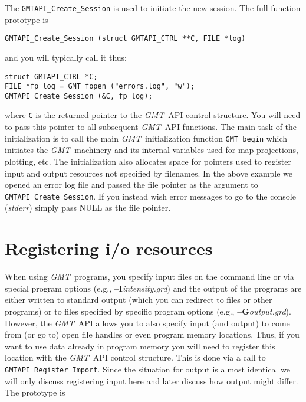 \documentclass{report}
\newcommand{\GMT}{\textit{GMT}}%
\newcommand{\GMT}{\htmladdnormallink{\texttt{[image: eps/GMT\_glyph10.eps]}}{http://gmt.soest.hawaii.edu}}%
\newcommand{\Opt}[1]{{\bf --#1}}%
\newcommand{\GMT}{\htmladdnormallink{\textbf{GMT}}{http://gmt.soest.hawaii.edu}}%
\newcommand{\Opt}[1]{{\bf -#1}}%
\begin{document}
The \texttt{GMTAPI\_Create\_Session} is used to initiate the new session.  The full
function prototype is

\begin{verbatim}
GMTAPI_Create_Session (struct GMTAPI_CTRL **C, FILE *log)
\end{verbatim}
and you will typically call it thus:
\begin{verbatim}
struct GMTAPI_CTRL *C;
FILE *fp_log = GMT_fopen ("errors.log", "w");
GMTAPI_Create_Session (&C, fp_log);
\end{verbatim}
where \texttt{C} is the returned pointer to the \GMT\ API control structure.  You will need to
pass this pointer to all subsequent \GMT\ API functions.  The main task of the initialization
is to call the main \GMT\ initialization function \texttt{GMT\_begin} which initiates the \GMT\
machinery and its internal variables used for map projections, plotting, etc.  The initialization
also allocates space for pointers used to register input and output resources not specified by filenames.
In the above example we opened an error log file and passed the file pointer as the argument to
\texttt{GMTAPI\_Create\_Session}.  If you instead wish error messages to go to the console
(\emph{stderr}) simply pass NULL as the file pointer.

\section{Registering i/o resources}
\index{GMT@\GMT!Registering i/o resources}
When using \GMT\ programs, you specify input files on
the command line or via special program options (e.g., \Opt{I}{\it intensity.grd}) and the output of
the programs are either written to standard output (which you can redirect to files or other programs)
or to files specified by specific program options (e.g., \Opt{G}{\it output.grd}).  However, the
\GMT\ API allows you to also specify input (and output) to come from (or go to) open file handles
or even program memory locations.  Thus, if you want to use data already in program memory you will
need to register this location with the \GMT\ API control structure.  This is done via a call to
\texttt{GMTAPI\_Register\_Import}.  Since the situation for output is almost identical we will only
discuss registering input here and later discuss how output might differ.  The prototype is
\end{document}
